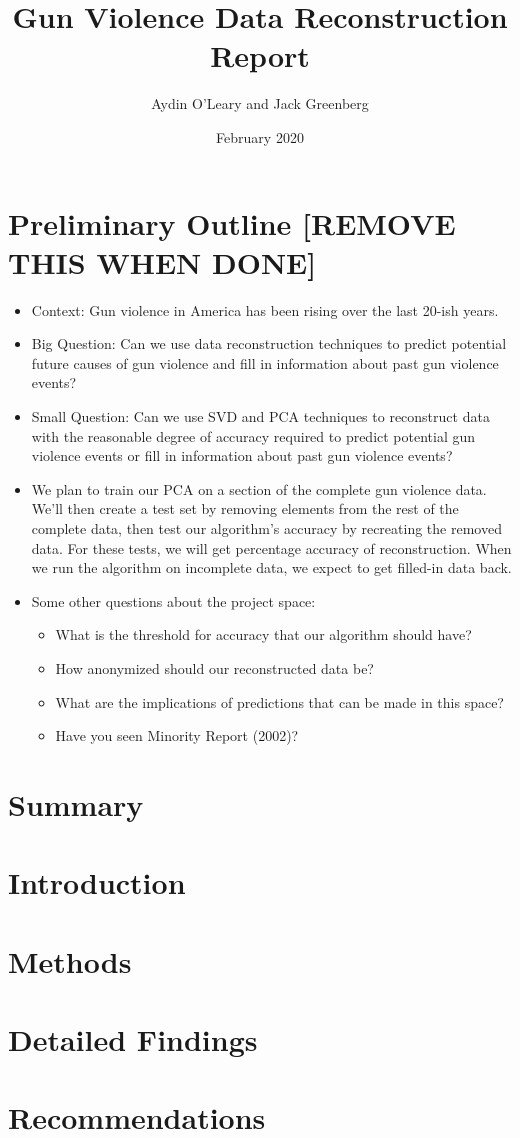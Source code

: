 \documentclass{article}
\title{Gun Violence Data Reconstruction Report}
\author{Aydin O'Leary and Jack Greenberg }
\date{February 2020}
\begin{document}
\maketitle

\section*{Preliminary Outline [REMOVE THIS WHEN DONE]}

\begin{itemize}
    \item Context: Gun violence in America has been rising over the last 20-ish years. \cite{website:cdc-data}
    \item Big Question: Can we use data reconstruction techniques to predict potential future causes of gun violence and fill in information about past gun violence events?
    \item Small Question: Can we use SVD and PCA techniques to reconstruct data with the reasonable degree of accuracy required to predict potential gun violence events or fill in information about past gun violence events?
    \item We plan to train our PCA on a section of the complete gun violence data. We'll then create a test set by removing elements from the rest of the complete data, then test our algorithm's accuracy by recreating the removed data. For these tests, we will get percentage accuracy of reconstruction. When we run the algorithm on incomplete data, we expect to get filled-in data back.
    \item Some other questions about the project space: \begin{itemize}
        \item What is the threshold for accuracy that our algorithm should have?
        \item How anonymized should our reconstructed data be?
        \item What are the implications of predictions that can be made in this space?
        \item Have you seen Minority Report (2002)?
    \end{itemize}
\end{itemize}

\section*{Summary}
\section*{Introduction}
\section*{Methods}
\section*{Detailed Findings}
\section*{Recommendations}


 
\end{document}
